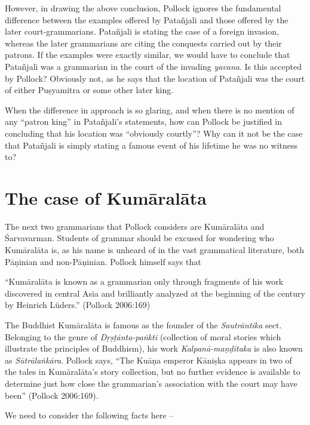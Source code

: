However, in drawing the above conclusion, Pollock ignores the fundamental difference between the examples offered by Patañjali and those offered by the later court-grammarians. Patañjali is stating the case of a foreign invasion, whereas the later grammarians are citing the conquests carried out by their patrons. If the examples were exactly similar, we would have to conclude that Patañjali was a grammarian in the court of the invading {\sl yavana}. Is this accepted by Pollock? Obviously not, as he says that the location of Patañjali was the court of either Puṣyamitra or some other later king.

When the difference in approach is so glaring, and when there is no mention of any ``patron king'' in Patañjali's statements, how can Pollock be justified in concluding that his location was ``obviously courtly''? Why can it not be the case that Patañjali is simply stating a famous event of his lifetime he was no witness to?

\section{The case of Kumāralāta}\label{chap3-sec10}

The next two grammarians that Pollock considers are Kumāralāta and Śarvavarman. Students of grammar should be excused for wondering who Kumāralāta is, as his name is unheard of in the vast grammatical literature, both Pāṇinian and non-Pāṇinian. Pollock himself says that 
\begin{myquote}
``Kumāralāta is known as a grammarian only through fragments of his work discovered in central Asia and brilliantly analyzed at the beginning of the century by Heinrich Lüders.''
\hfill (Pollock 2006:169)
\end{myquote}

\newpage

The Buddhist Kumāralāta is famous as the founder of the {\sl Sautrāntika} sect. Belonging to the genre of {\sl Dṛṣṭānta-paṅkti} (collection of moral stories which illustrate the principles of Buddhism), his work {\sl Kalpanā-maṇḍitaka} is also known as {\sl Sūtrālaṅkāra}. Pollock says, ``The Kuāṇa emperor Kāniṣka appears in two of the tales in Kumāralāta's story collection, but no further evidence is available to determine just how close the grammarian's association with the court may have been'' (Pollock 2006:169).

We need to consider the following facts here --

